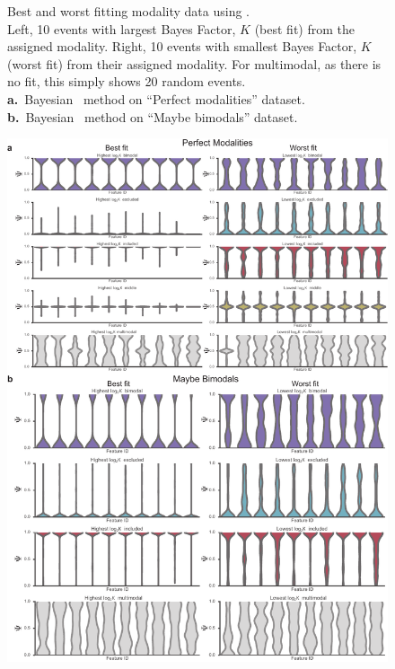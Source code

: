 \clearpage
\thispagestyle{facingcaption}
\begin{figure}[h]
\captionsetup{labelformat=prev-page}
  \caption[Best and worst fitting modality data using \anchor.]{
  Best and worst fitting modality data using \anchor.\\
Left, 10 events with largest Bayes Factor, $K$ (best fit) from the assigned modality. Right, 10 events with smallest Bayes Factor, $K$ (worst fit) from their assigned modality. For multimodal, as there is no fit, this simply shows 20 random events.\\
\textbf{a.}~Bayesian \anchor\, method on ``Perfect modalities'' dataset.\\
\textbf{b.}~Bayesian \anchor\, method on ``Maybe bimodals'' dataset.
}
\label{fig:anchor_best_worst}
\end{figure}
\clearpage
\begin{figure}[h]
\ContinuedFloat
\captionsetup{labelformat=empty}
\centering
  \includegraphics[width=5.8in]{figures/anchor_best_worst}
\end{figure}
\addtocounter{figure}{1}
\clearpage




